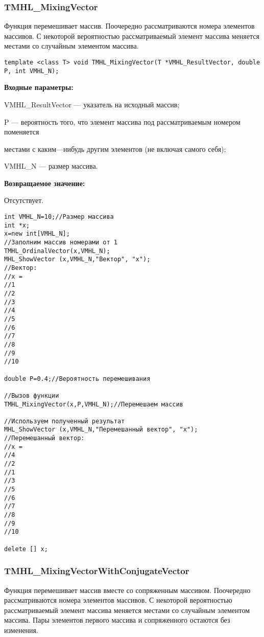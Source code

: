 \documentclass[a4paper,12pt]{article}
\begin{document}
\subsubsection{TMHL\_MixingVector}\label{TMHL_MixingVector}

Функция перемешивает массив. Поочередно рассматриваются номера элементов массивов. С некоторой вероятностью рассматриваемый элемент массива меняется местами со случайным элементом массива.


\begin{lstlisting}[label=code_syntax_TMHL_MixingVector,caption=Синтаксис]
template <class T> void TMHL_MixingVector(T *VMHL_ResultVector, double P, int VMHL_N);
\end{lstlisting}

\textbf{Входные параметры:}  
 
VMHL\_ResultVector --- указатель на исходный массив;
 
P --- вероятность того, что элемент массива под рассматриваемым номером поменяется
 
местами с каким---нибудь другим элементов (не включая самого себя);
 
VMHL\_N --- размер массива.

\textbf{Возвращаемое значение:}

Отсутствует.


\begin{lstlisting}[label=code_use_TMHL_MixingVector,caption=Пример использования]
int VMHL_N=10;//Размер массива
int *x;
x=new int[VMHL_N];
//Заполним массив номерами от 1
TMHL_OrdinalVector(x,VMHL_N);
MHL_ShowVector (x,VMHL_N,"Вектор", "x");
//Вектор:
//x =
//1
//2
//3
//4
//5
//6
//7
//8
//9
//10

double P=0.4;//Вероятность перемешивания

//Вызов функции
TMHL_MixingVector(x,P,VMHL_N);//Перемешаем массив

//Используем полученный результат
MHL_ShowVector (x,VMHL_N,"Перемешанный вектор", "x");
//Перемешанный вектор:
//x =
//4
//2
//1
//3
//5
//6
//7
//8
//9
//10

delete [] x;
\end{lstlisting}

\subsubsection{TMHL\_MixingVectorWithConjugateVector}\label{TMHL_MixingVectorWithConjugateVector}

Функция перемешивает массив вместе со сопряженным массивом. Поочередно рассматриваются номера элементов массивов. С некоторой вероятностью рассматриваемый элемент массива меняется местами со случайным элементом массива. Пары элементов первого массива и сопряженного остаются без изменения.
\end{document}
